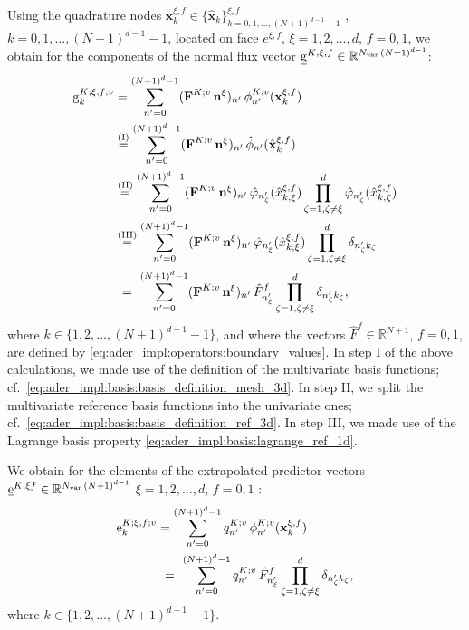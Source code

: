 \documentclass{scrreprt}
\theoremstyle{definition}
\theoremstyle{nonumberplain}
\renewcommand{\vec}[1]{{\textbf{#1}}}
\newcommand{\laVec}[1]{\underline{\mathrm{#1}}}
\newcommand{\laVecel}[1]{\mathrm{#1}}
\newcommand{\cell}{K}
\newcommand{\refVec}[1]{\hat{\vec{#1}}}
\begin{document}
Using the quadrature nodes
$\vec{x}^{\xi, f}_k\in\{\refVec{x}_{k}\}_{k=0,1,\ldots,(N+1)^{d-1}-1}^{\xi, f}$
,$k=0,1,\ldots,(N+1)^{d-1}-1$,
located on face $e^{\xi, f}$,
$\xi=1,2,\ldots,d$, $f=0,1$,
we obtain for the components of the normal flux vector
$\laVec{g}^{K;\xi, f}\in\mathbb{R}^{N_\textup{var}\,(N+1)^{d-1}}$:
\begin{align*}
\laVecel{g}^{K;\xi, f;v}_k
&=
\sum_{n'=0}^{(N+1)^{d}-1}
(\vec{F}^{\cell;v}\,\vec{n}^{\xi})_{n'}\,
\phi^{\cell;v}_{n'}(\vec{x}^{\xi, f}_k)
\\
&
\overset{\textup{(I)}}
{=}
\sum_{n'=0}^{(N+1)^{d}-1}
(\vec{F}^{\cell;v}\,\vec{n}^{\xi})_{n'}\,
\hat{\phi}_{n'}(\refVec{x}^{\xi, f}_k)
\\
&
\overset{\textup{(II)}}
{=}
\sum_{n'=0}^{(N+1)^{d}-1}
(\vec{F}^{\cell;v}\,\vec{n}^{\xi})_{n'}\,
\hat{\varphi}_{n'_\zeta}(\hat{x}^{\xi, f}_{k,\xi})
\prod_{\zeta=1,\zeta\neq\xi}^{d}
\hat{\varphi}_{n'_\zeta}(\hat{x}^{\xi, f}_{k,\zeta})
\\
&
\overset{\textup{(III)}}
{=}
\sum_{n'=0}^{(N+1)^{d}-1}
(\vec{F}^{\cell;v}\,\vec{n}^{\xi})_{n'}\,
\hat{\varphi}_{n'_\xi}(\hat{x}^{\xi, f}_{k,\xi})
\prod_{\zeta=1,\zeta\neq\xi}^{d}
\delta_{n'_\zeta k_\zeta}
\\
&
\overset{\phantom{\textup{(IV)}}}
{=}
\sum_{n'=0}^{(N+1)^{d}-1}
(\vec{F}^{\cell;v}\,\vec{n}^{\xi})_{n'}\,
\hat{F}^f_{n'_\xi}
\prod_{\zeta=1,\zeta\neq\xi}^{d}
\delta_{n'_\zeta k_\zeta},
\end{align*}
where $k\in\{1,2,\ldots,(N+1)^{d-1}-1\}$, and
where the vectors $\hat{F}^f \in \mathbb{R}^{N+1}$,
$f=0,1$, are defined by \eqref{eq:ader_impl:operators:boundary_values}.
In step I of the above calculations, we made use of the definition of the
multivariate basis functions; cf.~\eqref{eq:ader_impl:basis:basis_definition_mesh_3d}.
In step II, we split the multivariate reference basis functions
into the univariate ones; cf.~\eqref{eq:ader_impl:basis:basis_definition_ref_3d}.
In step III, we made use of the Lagrange basis property
\eqref{eq:ader_impl:basis:lagrange_ref_1d}.

We obtain for the elements of the extrapolated
predictor vectors $\laVec{e}^{K;\xi
f}\in\mathbb{R}^{N_\textup{var}\,(N+1)^{d-1}}$ $\xi=1,2,\ldots,d$, $f=0,1$
:
\begin{align*}
\laVecel{e}^{K;\xi, f;v}_{k}
&=
\sum_{n'=0}^{(N+1)^{d}-1}
q^{\cell;v}_{n'}\,
\phi^{\cell;v}_{n'}(\vec{x}^{\xi, f}_k)
\\
&
\overset{\phantom{\textup{(IV)}}}
{=}
\sum_{n'=0}^{(N+1)^{d}-1}
q^{\cell;v}_{n'}\,
\hat{F}^f_{n'_\xi}
\prod_{\zeta=1,\zeta\neq\xi}^{d}
\delta_{n'_\zeta k_\zeta},
\end{align*}
where $k\in\{1,2,\ldots,(N+1)^{d-1}-1\}$.
\end{document}
